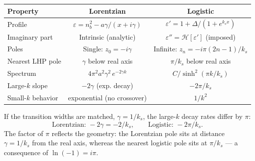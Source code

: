 \documentclass[11pt]{article}
\newcommand{\kk}{k_s}
\newcommand{\gam}{\gamma}
\newcommand{\eps}{\varepsilon}
\begin{document}
\begin{center}
\begin{tabular}{lcc}
\toprule
Property & Lorentzian & Logistic \\
\midrule
Profile & $\eps = n_b^2 - a\gam/(x+i\gam)$ & $\eps' = 1 + \Delta/(1+e^{\kk x})$ \\
Imaginary part & Intrinsic (analytic) & $\eps'' = \mathcal{H}[\eps']$ (imposed) \\
Poles & Single: $z_0 = -i\gam$ & Infinite: $z_n = -i\pi(2n-1)/\kk$ \\
Nearest LHP pole & $\gam$ below real axis & $\pi/\kk$ below real axis \\
Spectrum & $4\pi^2 a^2\gam^2\,e^{-2\gam k}$ & $C/\sinh^2(\pi k/\kk)$ \\
Large-$k$ slope & $-2\gam$ (exp. decay) & $-2\pi/\kk$ \\
Small-$k$ behavior & exponential (no crossover) & $1/k^2$ \\
\bottomrule
\end{tabular}
\end{center}

\noindent
If the transition widths are matched, $\gam = 1/\kk$, the large-$k$ decay
rates differ by $\pi$:
\begin{equation}
    \text{Lorentzian: } -2\gam = -2/\kk,
    \qquad
    \text{Logistic: } -2\pi/\kk.
\end{equation}
The factor of $\pi$ reflects the geometry: the Lorentzian pole sits at
distance $\gam=1/\kk$ from the real axis, whereas the nearest logistic pole
sits at $\pi/\kk$ — a consequence of $\ln(-1)=i\pi$.
\end{document}
